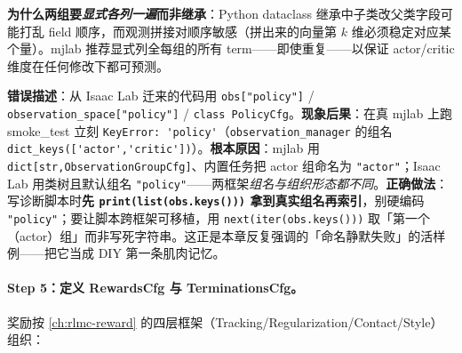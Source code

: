 \textbf{为什么两组要\emph{显式各列一遍}而非继承}：Python dataclass 继承中子类改父类字段可能打乱 field 顺序，而观测拼接对顺序敏感（拼出来的向量第 $k$ 维必须稳定对应某个量）。mjlab 推荐显式列全每组的所有 term——即使重复——以保证 actor/critic 维度在任何修改下都可预测。

\begin{pitfall}
\textbf{错误描述}：从 Isaac Lab 迁来的代码用 \verb|obs["policy"]| / \verb|observation_space["policy"]| / \verb|class PolicyCfg|。\textbf{现象后果}：在真 mjlab 上跑 smoke\_test 立刻 \verb|KeyError: 'policy'|（\verb|observation_manager| 的组名 \verb|dict_keys(['actor','critic'])|）。\textbf{根本原因}：mjlab 用 \verb|dict[str,ObservationGroupCfg]|、内置任务把 actor 组命名为 \verb|"actor"|；Isaac Lab 用类树且默认组名 \verb|"policy"|——两框架\emph{组名与组织形态都不同}。\textbf{正确做法}：写诊断脚本时\textbf{先 \texttt{print(list(obs.keys()))} 拿到真实组名再索引}，别硬编码 \verb|"policy"|；要让脚本跨框架可移植，用 \verb|next(iter(obs.keys()))| 取「第一个（actor）组」而非写死字符串。这正是本章反复强调的「命名静默失败」的活样例——把它当成 DIY 第一条肌肉记忆。
\end{pitfall}

\paragraph{Step 5：定义 RewardsCfg 与 TerminationsCfg。}奖励按 \cref{ch:rlmc-reward} 的四层框架（Tracking/Regularization/Contact/Style）组织：

